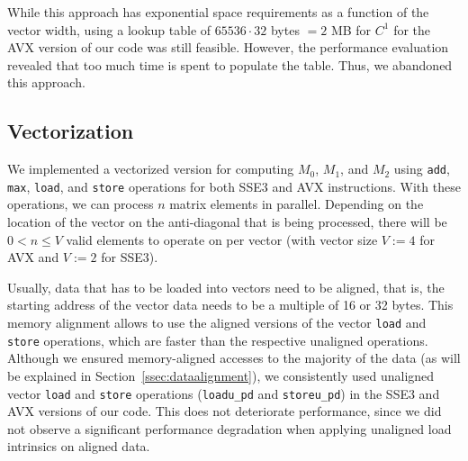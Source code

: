 \documentclass[runningheads,a4paper]{llncs}
\begin{document}
While this approach has exponential space requirements as a function of the vector width, using a lookup table of $65536 \cdot 32$ bytes $= 2$ MB for $C^1$ for 
the AVX version of our code was still feasible. 
However, the performance evaluation revealed that too much time is spent to populate the table. 
Thus, we abandoned this approach.



\subsection{Vectorization}
\label{ssec:vectorization}

We implemented a vectorized version for computing 
$M_0$, $M_1$, and $M_2$ using \texttt{add}, \texttt{max}, \texttt{load}, and \texttt{store}
operations for both SSE3 and AVX instructions.  
With these operations, we can process $n$ matrix elements in parallel.  
Depending on the location of the vector on the anti-diagonal that is being processed, there will be $0 < n \leq V$ valid elements to operate on 
per vector (with vector size $V := 4$ for AVX and $V := 2$ for SSE3). 

Usually, data that has to be loaded into vectors need to be aligned, that is, the starting
address of the vector data needs to be a multiple of 16 or 32 bytes. This memory alignment allows to
use the aligned versions of the vector \texttt{load} and \texttt{store} operations,
which are faster than the respective unaligned operations.
Although we ensured memory-aligned accesses to the majority of the data (as will be explained in
Section~\ref{ssec:dataalignment}), we consistently used unaligned vector \texttt{load} and \texttt{store}
operations (\texttt{loadu\_pd} and \texttt{storeu\_pd}) in the SSE3 and AVX versions of our code. 
This does not deteriorate performance, since we did not observe a significant performance degradation when
applying unaligned load intrinsics on aligned data.
\end{document}
